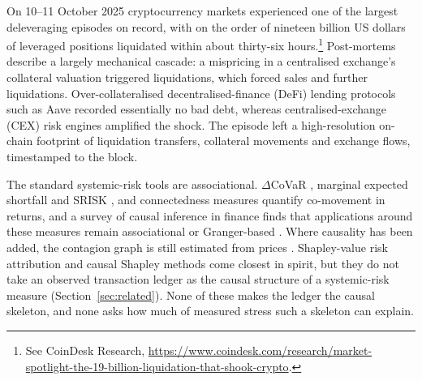 \documentclass[referee,pdflatex,sn-mathphys-ay]{sn-jnl}
\theoremstyle{thmstyleone}%
\theoremstyle{thmstyletwo}%
\theoremstyle{thmstylethree}%
\begin{document}
On 10--11 October 2025 cryptocurrency markets experienced one of the largest
deleveraging episodes on record, with on the order of nineteen billion US dollars of
leveraged positions liquidated within about thirty-six hours.\footnote{See CoinDesk
Research, \url{https://www.coindesk.com/research/market-spotlight-the-19-billion-liquidation-that-shook-crypto}.}
Post-mortems \citep{ali2025anatomy,lim2026cascade} describe a largely mechanical cascade:
a mispricing in a centralised exchange's collateral valuation triggered liquidations,
which forced sales and further liquidations. Over-collateralised decentralised-finance
(DeFi) lending protocols such as Aave recorded essentially no bad debt, whereas
centralised-exchange (CEX) risk engines amplified the shock. The episode left a
high-resolution on-chain footprint of liquidation transfers, collateral movements and
exchange flows, timestamped to the block.

The standard systemic-risk tools are associational. $\Delta$CoVaR \citep{adrian2016covar},
marginal expected shortfall and SRISK \citep{acharya2017measuring}, and connectedness
measures \citep{diebold2014network,billio2012econometric} quantify co-movement in
returns, and a survey of causal inference in finance finds that applications around
these measures remain associational or Granger-based \citep{kumar2025causalreview}. Where
causality has been added, the contagion graph is still estimated from prices
\citep{rigana2024neco,rigana2023new,etesami2023tvdig,giudici2018corisk}. Shapley-value
risk attribution \citep{tarashev2016attributing} and causal Shapley methods
\citep{heskes2020causal,singal2021flow} come closest in spirit, but they do not take an observed
transaction ledger as the causal structure of a systemic-risk measure (Section~\ref{sec:related}).
None of these makes the ledger the causal skeleton, and none asks how much of measured
stress such a skeleton can explain.
\end{document}
